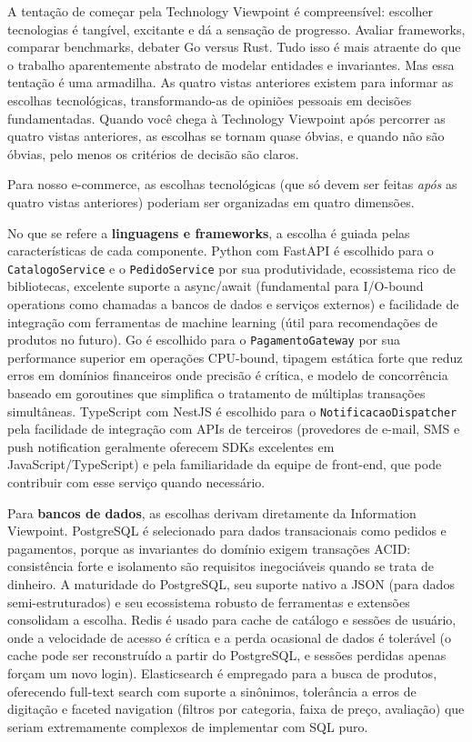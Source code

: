 A tentação de começar pela Technology Viewpoint é compreensível: escolher
tecnologias é tangível, excitante e dá a sensação de progresso. Avaliar frameworks,
comparar benchmarks, debater Go versus Rust. Tudo isso é mais atraente do que
o trabalho aparentemente abstrato de modelar entidades e invariantes. Mas essa
tentação é uma armadilha. As quatro vistas anteriores existem para
informar as escolhas tecnológicas, transformando-as de opiniões pessoais em
decisões fundamentadas. Quando você chega à Technology Viewpoint após percorrer as
quatro vistas anteriores, as escolhas se tornam quase óbvias, e quando não são
óbvias, pelo menos os critérios de decisão são claros.

Para nosso e-commerce, as escolhas tecnológicas (que só devem ser feitas
\emph{após} as quatro vistas anteriores) poderiam ser organizadas em quatro
dimensões.

No que se refere a \textbf{linguagens e frameworks}, a escolha é guiada pelas
características de cada componente. Python com FastAPI é escolhido para o
\texttt{CatalogoService} e o \texttt{PedidoService} por sua produtividade,
ecossistema rico de bibliotecas, excelente suporte a async/await (fundamental para
I/O-bound operations como chamadas a bancos de dados e serviços externos) e
facilidade de integração com ferramentas de machine learning (útil para
recomendações de produtos no futuro). Go é escolhido para o \texttt{PagamentoGateway}
por sua performance superior em operações CPU-bound, tipagem estática forte que
reduz erros em domínios financeiros onde precisão é crítica, e modelo de
concorrência baseado em goroutines que simplifica o tratamento de múltiplas
transações simultâneas. TypeScript com NestJS é escolhido para o
\texttt{NotificacaoDispatcher} pela facilidade de integração com APIs de terceiros
(provedores de e-mail, SMS e push notification geralmente oferecem SDKs excelentes
em JavaScript/TypeScript) e pela familiaridade da equipe de front-end, que pode
contribuir com esse serviço quando necessário.

Para \textbf{bancos de dados}, as escolhas derivam diretamente da Information
Viewpoint. PostgreSQL é selecionado para dados transacionais como pedidos e
pagamentos, porque as invariantes do domínio exigem transações ACID:
consistência forte e isolamento são requisitos inegociáveis quando se trata de
dinheiro. A maturidade do PostgreSQL, seu suporte nativo a JSON (para dados
semi-estruturados) e seu ecossistema robusto de ferramentas e extensões consolidam
a escolha. Redis é usado para cache de catálogo e sessões de usuário, onde a
velocidade de acesso é crítica e a perda ocasional de dados é tolerável (o cache
pode ser reconstruído a partir do PostgreSQL, e sessões perdidas apenas forçam
um novo login). Elasticsearch é empregado para a busca de produtos, oferecendo
full-text search com suporte a sinônimos, tolerância a erros de digitação e
faceted navigation (filtros por categoria, faixa de preço, avaliação) que seriam
extremamente complexos de implementar com SQL puro.

